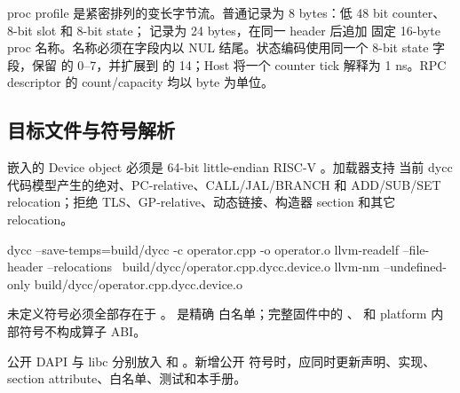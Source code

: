 \documentclass[../dayan_kernel_manual.tex]{subfiles}
\begin{document}
proc profile 是紧密排列的变长字节流。普通记录为 8 bytes：低 48 bit counter、
8-bit slot 和 8-bit state； 记录为 24 bytes，在同一 header 后追加
固定 16-byte proc 名称。名称必须在字段内以 NUL 结尾。状态编码使用同一个 8-bit state
字段，保留  的 0--7，并扩展到
 的 14；Host 将一个 counter
tick 解释为 1 ns。RPC descriptor 的 count/capacity 均以 byte 为单位。

\subsection{目标文件与符号解析}

嵌入的 Device object 必须是 64-bit little-endian RISC-V 。加载器支持
当前 dycc 代码模型产生的绝对、PC-relative、CALL/JAL/BRANCH 和 ADD/SUB/SET
relocation；拒绝 TLS、GP-relative、动态链接、构造器 section 和其它 relocation。

\begin{dayancode}
dycc --save-temps=build/dycc -c operator.cpp -o operator.o
llvm-readelf --file-header --relocations \
  build/dycc/operator.cpp.dycc.device.o
llvm-nm --undefined-only build/dycc/operator.cpp.dycc.device.o
\end{dayancode}

未定义符号必须全部存在于 。 是精确
白名单；完整固件中的 、 和 platform 内部符号不构成算子
ABI。

公开 DAPI 与 libc 分别放入  和 。新增公开
符号时，应同时更新声明、实现、section attribute、白名单、测试和本手册。
\end{document}
